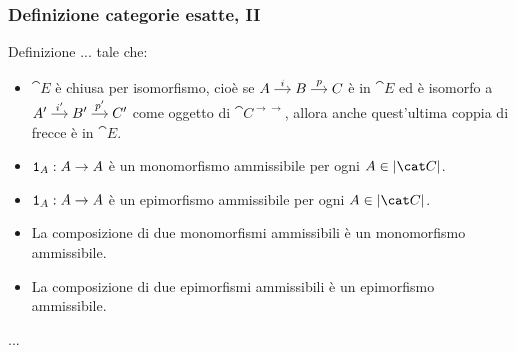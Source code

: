 \documentclass{beamer}
\begin{document}
\begin{frame}[fragile]
  \frametitle{Definizione categorie esatte, II}

  \begin{block}{Definizione}
    ... tale che:
    \begin{itemize}
  \item \(\cat E\) è chiusa per isomorfismo, cioè se
    \(\begin{tikzcd}[column sep=small, cramped] A \ar["{i}", r] & B
      \ar["{p}", r] & C \end{tikzcd}\) è in \(\cat E\) ed è isomorfo a
    \(\begin{tikzcd}[column sep=small, cramped] A' \ar["{i'}", r] & B'
      \ar["{p'}", r] & C' \end{tikzcd}\) come oggetto di
    \(\cat C^{\to\to}\), allora anche quest'ultima coppia di frecce è in
    \(\cat E\).
  \item \label{item:EO} \(\mathtt 1_A : A \to A\) è un monomorfismo
    ammissibile per ogni \(A \in \obj{\cat C}\).
  \item \label{item:EOop} \(\mathtt 1_A : A \to A\) è un epimorfismo
    ammissibile per ogni \(A \in \obj{\cat C}\).
  \item \label{item:E1} La composizione di due monomorfismi ammissibili
    è un monomorfismo ammissibile.
  \item \label{item:E1op} La composizione di due epimorfismi ammissibili
    è un epimorfismo ammissibile.
  \end{itemize}
  ...
  \end{block}
  
\end{frame}
\end{document}
